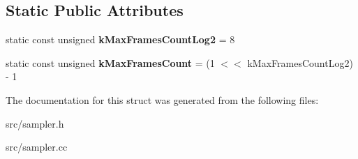 \subsection*{Static Public Attributes}
\begin{DoxyCompactItemize}
\item 
\hypertarget{structv8_1_1internal_1_1_tick_sample_a1e37b1a4cc6b4f1e66d511164e141fb4}{}static const unsigned {\bfseries k\+Max\+Frames\+Count\+Log2} = 8\label{structv8_1_1internal_1_1_tick_sample_a1e37b1a4cc6b4f1e66d511164e141fb4}

\item 
\hypertarget{structv8_1_1internal_1_1_tick_sample_afa87acb650029f445faeaa7536e2cd8f}{}static const unsigned {\bfseries k\+Max\+Frames\+Count} = (1 $<$$<$ k\+Max\+Frames\+Count\+Log2) -\/ 1\label{structv8_1_1internal_1_1_tick_sample_afa87acb650029f445faeaa7536e2cd8f}

\end{DoxyCompactItemize}


The documentation for this struct was generated from the following files\+:\begin{DoxyCompactItemize}
\item 
src/sampler.\+h\item 
src/sampler.\+cc\end{DoxyCompactItemize}
